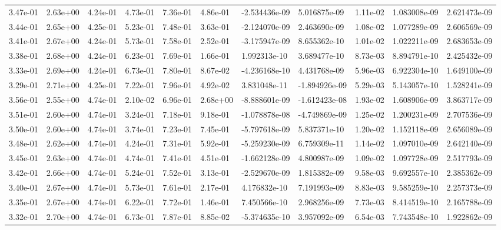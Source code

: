 \begin{longtable}{| p{} | p{} |}
3.47e-01 & 2.63e+00 & 4.24e-01 & 4.73e-01 & 7.36e-01 & 4.86e-01 & -2.534436e-09 &  5.016875e-09 &  1.11e-02 &  1.083008e-09 &  2.621473e-09 \\
3.44e-01 & 2.65e+00 & 4.25e-01 & 5.23e-01 & 7.48e-01 & 3.63e-01 & -2.124070e-09 &  2.463690e-09 &  1.08e-02 &  1.077289e-09 &  2.606569e-09 \\
3.41e-01 & 2.67e+00 & 4.24e-01 & 5.73e-01 & 7.58e-01 & 2.52e-01 & -3.175947e-09 &  8.655362e-10 &  1.01e-02 &  1.022211e-09 &  2.683653e-09 \\
3.38e-01 & 2.68e+00 & 4.24e-01 & 6.23e-01 & 7.69e-01 & 1.66e-01 &  1.992313e-10 &  3.689477e-10 &  8.73e-03 &  8.894791e-10 &  2.425432e-09 \\
3.33e-01 & 2.69e+00 & 4.24e-01 & 6.73e-01 & 7.80e-01 & 8.67e-02 & -4.236168e-10 &  4.431768e-09 &  5.96e-03 &  6.922304e-10 &  1.649100e-09 \\
3.29e-01 & 2.71e+00 & 4.25e-01 & 7.22e-01 & 7.96e-01 & 4.92e-02 &  3.831048e-11 & -1.894926e-09 &  5.29e-03 &  5.143057e-10 &  1.528241e-09 \\
3.56e-01 & 2.55e+00 & 4.74e-01 & 2.10e-02 & 6.96e-01 & 2.68e+00 & -8.888601e-09 & -1.612423e-08 &  1.93e-02 &  1.608906e-09 &  3.863717e-09 \\
3.51e-01 & 2.60e+00 & 4.74e-01 & 3.24e-01 & 7.18e-01 & 9.18e-01 & -1.078878e-08 & -4.749869e-09 &  1.25e-02 &  1.200231e-09 &  2.707536e-09 \\
3.50e-01 & 2.60e+00 & 4.74e-01 & 3.74e-01 & 7.23e-01 & 7.45e-01 & -5.797618e-09 &  5.837371e-10 &  1.20e-02 &  1.152118e-09 &  2.656089e-09 \\
3.48e-01 & 2.62e+00 & 4.74e-01 & 4.24e-01 & 7.31e-01 & 5.92e-01 & -5.259230e-09 &  6.759309e-11 &  1.14e-02 &  1.097010e-09 &  2.642140e-09 \\
3.45e-01 & 2.63e+00 & 4.74e-01 & 4.74e-01 & 7.41e-01 & 4.51e-01 & -1.662128e-09 &  4.800987e-09 &  1.09e-02 &  1.097728e-09 &  2.517793e-09 \\
3.42e-01 & 2.66e+00 & 4.74e-01 & 5.24e-01 & 7.52e-01 & 3.13e-01 & -2.529670e-09 &  1.815382e-09 &  9.58e-03 &  9.692557e-10 &  2.385362e-09 \\
3.40e-01 & 2.67e+00 & 4.74e-01 & 5.73e-01 & 7.61e-01 & 2.17e-01 &  4.176832e-10 &  7.191993e-09 &  8.83e-03 &  9.585259e-10 &  2.257373e-09 \\
3.35e-01 & 2.67e+00 & 4.74e-01 & 6.22e-01 & 7.72e-01 & 1.46e-01 &  7.450566e-10 &  2.968256e-09 &  7.73e-03 &  8.414519e-10 &  2.165788e-09 \\
3.32e-01 & 2.70e+00 & 4.74e-01 & 6.73e-01 & 7.87e-01 & 8.85e-02 & -5.374635e-10 &  3.957092e-09 &  6.54e-03 &  7.743548e-10 &  1.922862e-09 \\

\end{longtable}
